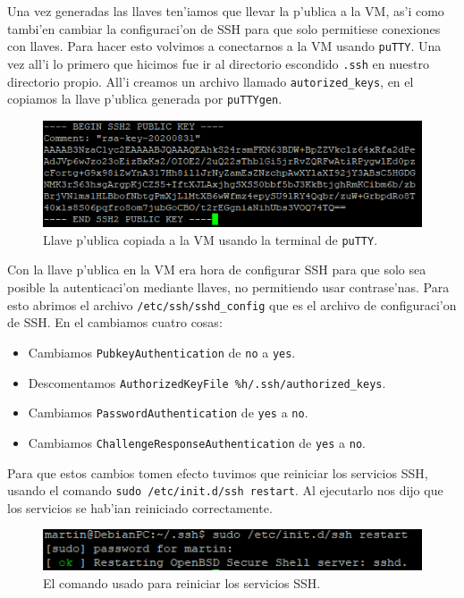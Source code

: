 \documentclass[11pt]{article}
\begin{document}
		Una vez generadas las llaves ten'iamos que llevar la p'ublica a la VM, as'i como tambi'en cambiar la configuraci'on de SSH para que solo permitiese conexiones con llaves. Para hacer esto volvimos a conectarnos a la VM usando \texttt{puTTY}. Una vez all'i lo primero que hicimos fue ir al directorio escondido \texttt{.ssh} en nuestro directorio propio. All'i creamos un archivo llamado \texttt{autorized\_keys}, en el copiamos la llave p'ublica generada por \texttt{puTTYgen}. 
		
		\begin{figure}[H]
    			\centering
    			\includegraphics[scale=0.9]{Images/Connection/public_key.PNG}
    			\caption{Llave p'ublica copiada a la VM usando la terminal de \texttt{puTTY}.}
    			\label{fig:public_key}
		\end{figure}
		
		Con la llave p'ublica en la VM era hora de configurar SSH para que solo sea posible la autenticaci'on mediante llaves, no permitiendo usar contrase'nas. Para esto abrimos el archivo \texttt{/etc/ssh/sshd\_config} que es el archivo de configuraci'on de SSH. En el cambiamos cuatro cosas:
		
		\begin{itemize}
			\item Cambiamos \texttt{PubkeyAuthentication} de \texttt{no} a \texttt{yes}.
			\item Descomentamos \texttt{AuthorizedKeyFile \qquad \%h/.ssh/authorized\_keys}.
			\item Cambiamos \texttt{PasswordAuthentication} de \texttt{yes} a  \texttt{no}.
			\item Cambiamos \texttt{ChallengeResponseAuthentication} de \texttt{yes} a \texttt{no}.
		\end{itemize}
		
		Para que estos cambios tomen efecto tuvimos que reiniciar los servicios SSH, usando el comando \texttt{sudo /etc/init.d/ssh restart}. Al ejecutarlo nos dijo que los servicios se hab'ian reiniciado correctamente.
		
		\begin{figure}[H]
    			\centering
    			\includegraphics[scale=0.9]{Images/Connection/ssh_restart.PNG}
    			\caption{El comando usado para reiniciar los servicios SSH.}
    			\label{fig:ssh_restart}
		\end{figure}
		
\end{document}
